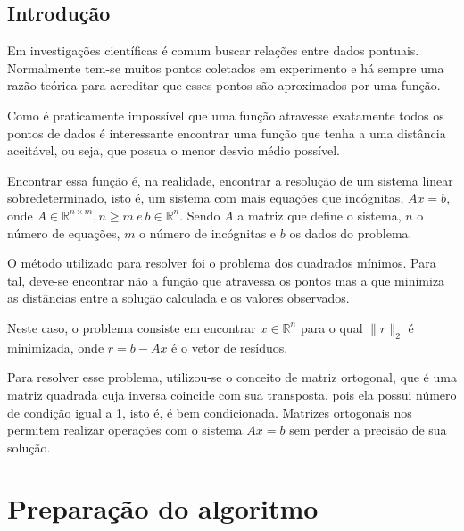\documentclass[
	12pt,				%
	openright,			%
	oneside,			%
	a4paper,			%
	english,			%
	french,				%
	spanish,			%
	brazil,				%
	]{abntex2}
\begin{document}
\chapter*[Introdução]{Introdução}

Em investigações científicas é comum buscar relações entre dados pontuais. Normalmente tem-se 
muitos pontos coletados em experimento e há sempre uma razão teórica para acreditar 
que esses pontos são aproximados por uma função.

Como é praticamente impossível que uma função atravesse exatamente todos os pontos de dados
é interessante encontrar uma função que tenha a uma distância aceitável, ou seja, que
possua o menor desvio médio possível.



Encontrar essa função é, na realidade, encontrar a resolução de um sistema linear sobredeterminado,
isto é, um sistema com mais equações que incógnitas, $Ax = b$, onde 
$A \in  \mathbb{R}^{n \times m}, n \ge m \ e \ b \in \mathbb{R}^n$. Sendo $A$ a matriz que define o sistema,
$n$ o número de equações, $m$ o número de incógnitas e $b$ os dados do problema. 

O método utilizado para resolver foi o problema dos quadrados mínimos. Para tal, deve-se encontrar não a função que atravessa os pontos mas a que minimiza as distâncias entre a solução calculada e os valores observados. 

Neste caso, o problema consiste em encontrar $x \in \mathbb{R}^n$ para o qual $\|r\|_2$ é minimizada, onde $r =  b-Ax$ é o vetor de 
resíduos. 

Para resolver esse problema, utilizou-se o conceito de matriz ortogonal, que é uma matriz quadrada cuja
inversa coincide com sua transposta, pois ela possui número de condição igual a 1, isto é, é bem condicionada.
Matrizes ortogonais nos permitem realizar operações com o sistema $Ax=b$ sem perder a precisão de sua solução.







\part{Preparação do algoritmo}
\end{document}
